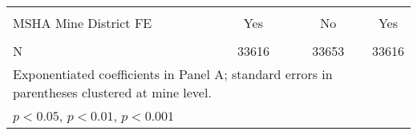 {\begin{tabular}{l*{3}{c}}
\hline \\
MSHA Mine District FE    &         Yes         &          No         &         Yes         \\
\\ \hline
N                        &       33616         &       33653         &       33616         \\
\hline\hline \multicolumn{3}{l}{\footnotesize Exponentiated coefficients in Panel A; standard errors in parentheses clustered at mine level.}\\\multicolumn{3}{l}{\footnotesize \sym{*} \(p<0.05\), \sym{**} \(p<0.01\), \sym{***} \(p<0.001\)}\\ \end{tabular} }
